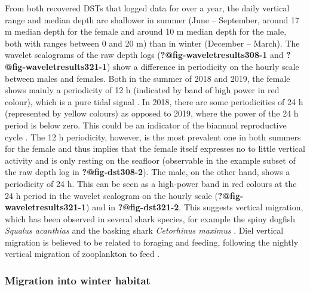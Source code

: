 \documentclass[
  authoryear,
  review,
  3p]{elsarticle}
\begin{document}
From both recovered DSTs that logged data for over a year, the daily
vertical range and median depth are shallower in summer (June --
September, around 17 m median depth for the female and around 10 m
median depth for the male, both with ranges between 0 and 20 m) than in
winter (December -- March). The wavelet scalograms of the raw depth logs
(\textbf{?@fig-waveletresults308-1} and
\textbf{?@fig-waveletresults321-1}) show a difference in periodicity on
the hourly scale between males and females. Both in the summer of 2018
and 2019, the female shows mainly a periodicity of 12 h (indicated by
band of high power in red colour), which is a pure tidal signal
\citep[since from one high tide to the next one it takes approximately
12 h, the same holds true for low tide,][]{shepard_2006}. In 2018, there
are some periodicities of 24 h (represented by yellow colours) as
opposed to 2019, where the power of the 24 h period is below zero. This
could be an indicator of the biannual reproductive cycle \citep[with
females feeding when they are not pregnant, and they stop feeding during
the migration to parturition grounds and parturition
itself,][p.~23]{michael_2006}. The 12 h periodicity, however, is the
most prevalent one in both summers for the female and thus implies that
the female itself expresses no to little vertical activity and is only
resting on the seafloor (observable in the example subset of the raw
depth log in \textbf{?@fig-dst308-2}). The male, on the other hand,
shows a periodicity of 24 h. This can be seen as a high-power band in
red colours at the 24 h period in the wavelet scalogram on the hourly
scale (\textbf{?@fig-waveletresults321-1}) and in
\textbf{?@fig-dst321-2}. This suggests vertical migration, which has
been observed in several shark species, for example the spiny dogfish
\emph{Squalus acanthias} \citep{carlson_2014} and the basking shark
\emph{Cetorhinus maximus} \citep{shepard_2006}. Diel vertical migration
is believed to be related to foraging and feeding, following the nightly
vertical migration of zooplankton to feed \citep{griffiths_2020}.

\hypertarget{sec-disc-wintermig}{%
\subsubsection{Migration into winter habitat}\label{sec-disc-wintermig}}
\end{document}
